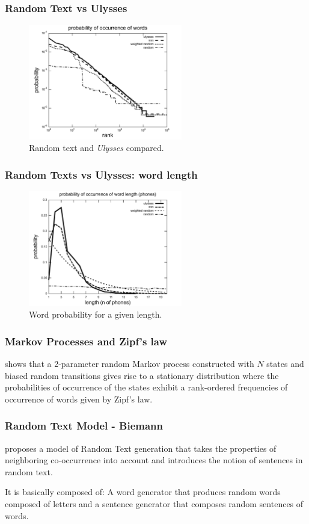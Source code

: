 \documentclass[notes]{beamer}
\begin{document}
\frame
{
  \frametitle{Random Text vs Ulysses}
    \begin{figure}[h!]
    \centering
    \includegraphics[width=0.6\textwidth]{imagespresentation/ulysses_compared_words_probabilities.pdf}
    \caption{Random text and \textit{Ulysses} compared.}
    \label{fig:ulysses_compared_words_probabilities}
    \end{figure}
}


\frame
{
  \frametitle{Random Texts vs Ulysses: word length}
    \begin{figure}[h!]
    \centering
    \includegraphics[width=0.6\textwidth]{imagespresentation/ulysses_compared_word_length_probabilities.pdf}
    \caption{Word probability for a given length.}
    \label{fig:ulysses_compared_word_length_probabilities}
    \end{figure}
}



\frame
{
  \frametitle{Markov Processes and Zipf's law}
  \cite{kanter1995} shows that a 2-parameter random Markov process constructed with $N$ states and biased
  random transitions gives rise to a stationary distribution where the probabilities of occurrence of the
  states exhibit a rank-ordered frequencies of occurrence of words given by Zipf's law.
}


\frame
{
  \frametitle{Random Text Model - Biemann}
  \cite{biemann2007} proposes a model of Random Text generation that
  takes the properties of neighboring co-occurrence into account
  and introduces the notion of sentences in random text.
 
  \vspace{0.5cm} 
  It is basically composed of: A word generator that produces random words 
  composed of letters and a sentence generator that composes random
  sentences of words.
}
\end{document}
